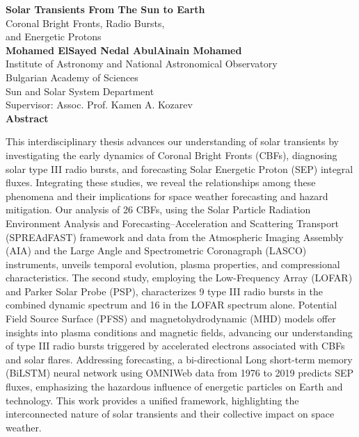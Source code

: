 \begin{center}
	\vspace*{0.25cm}
	\huge
	\textbf{Solar Transients From The Sun to Earth\\}
	\huge
	Coronal Bright Fronts, Radio Bursts,\\and Energetic Protons\\
	\vspace{0.5cm}
	\large
	\textbf{Mohamed ElSayed Nedal AbulAinain Mohamed\\}
	\vspace{0.5cm}
	\normalfont
	Institute of Astronomy and National Astronomical Observatory\\
	Bulgarian Academy of Sciences\\
	Sun and Solar System Department\\
	\vspace{0.5cm}
	\normalfont
	Supervisor: Assoc. Prof. Kamen A. Kozarev\\
	\vspace{1.5cm}
	\huge
	\textbf{Abstract}
	\vspace{0.7cm}
\end{center}

This interdisciplinary thesis advances our understanding of solar transients by investigating the early dynamics of Coronal Bright Fronts (CBFs), diagnosing solar type III radio bursts, and forecasting Solar Energetic Proton (SEP) integral fluxes. Integrating these studies, we reveal the relationships among these phenomena and their implications for space weather forecasting and hazard mitigation. Our analysis of 26 CBFs, using the Solar Particle Radiation Environment Analysis and Forecasting–Acceleration and Scattering Transport (SPREAdFAST) framework and data from the Atmospheric Imaging Assembly (AIA) and the Large Angle and Spectrometric Coronagraph (LASCO) instruments, unveils temporal evolution, plasma properties, and compressional characteristics. The second study, employing the Low-Frequency Array (LOFAR) and Parker Solar Probe (PSP), characterizes 9 type III radio bursts in the combined dynamic spectrum and 16 in the LOFAR spectrum alone. Potential Field Source Surface (PFSS) and magnetohydrodynamic (MHD) models offer insights into plasma conditions and magnetic fields, advancing our understanding of type III radio bursts triggered by accelerated electrons associated with CBFs and solar flares. Addressing forecasting, a bi-directional Long short-term memory (BiLSTM) neural network using OMNIWeb data from 1976 to 2019 predicts SEP fluxes, emphasizing the hazardous influence of energetic particles on Earth and technology. This work provides a unified framework, highlighting the interconnected nature of solar transients and their collective impact on space weather.
